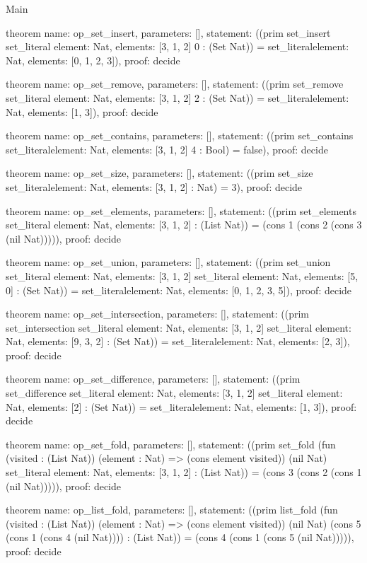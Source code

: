 \begin{lexlean}{Main}
\begin{semanticmodule}
theorem{
  name: op_set_insert,
  parameters: [],
  statement: ((prim set_insert set_literal{
    element: Nat,
    elements: [3, 1, 2]
  } 0 : (Set Nat)) = set_literal{element: Nat, elements: [0, 1, 2, 3]}),
  proof: decide{}
}

theorem{
  name: op_set_remove,
  parameters: [],
  statement: ((prim set_remove set_literal{
    element: Nat,
    elements: [3, 1, 2]
  } 2 : (Set Nat)) = set_literal{element: Nat, elements: [1, 3]}),
  proof: decide{}
}

theorem{
  name: op_set_contains,
  parameters: [],
  statement: ((prim set_contains set_literal{element: Nat, elements: [3, 1, 2]} 4 : Bool) = false),
  proof: decide{}
}

theorem{
  name: op_set_size,
  parameters: [],
  statement: ((prim set_size set_literal{element: Nat, elements: [3, 1, 2]} : Nat) = 3),
  proof: decide{}
}

theorem{
  name: op_set_elements,
  parameters: [],
  statement: ((prim set_elements set_literal{
    element: Nat,
    elements: [3, 1, 2]
  } : (List Nat)) = (cons 1 (cons 2 (cons 3 (nil Nat))))),
  proof: decide{}
}

theorem{
  name: op_set_union,
  parameters: [],
  statement: ((prim set_union set_literal{
    element: Nat,
    elements: [3, 1, 2]
  } set_literal{
    element: Nat,
    elements: [5, 0]
  } : (Set Nat)) = set_literal{element: Nat, elements: [0, 1, 2, 3, 5]}),
  proof: decide{}
}

theorem{
  name: op_set_intersection,
  parameters: [],
  statement: ((prim set_intersection set_literal{
    element: Nat,
    elements: [3, 1, 2]
  } set_literal{
    element: Nat,
    elements: [9, 3, 2]
  } : (Set Nat)) = set_literal{element: Nat, elements: [2, 3]}),
  proof: decide{}
}

theorem{
  name: op_set_difference,
  parameters: [],
  statement: ((prim set_difference set_literal{
    element: Nat,
    elements: [3, 1, 2]
  } set_literal{
    element: Nat,
    elements: [2]
  } : (Set Nat)) = set_literal{element: Nat, elements: [1, 3]}),
  proof: decide{}
}

theorem{
  name: op_set_fold,
  parameters: [],
  statement: ((prim set_fold (fun (visited : (List Nat)) (element : Nat) => (cons element visited)) (nil Nat) set_literal{
    element: Nat,
    elements: [3, 1, 2]
  } : (List Nat)) = (cons 3 (cons 2 (cons 1 (nil Nat))))),
  proof: decide{}
}

theorem{
  name: op_list_fold,
  parameters: [],
  statement: ((prim list_fold (fun (visited : (List Nat)) (element : Nat) => (cons element visited)) (nil Nat) (cons 5 (cons 1 (cons 4 (nil Nat)))) : (List Nat)) = (cons 4 (cons 1 (cons 5 (nil Nat))))),
  proof: decide{}
}


\end{semanticmodule}
\end{lexlean}
